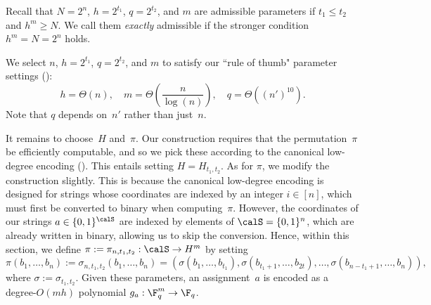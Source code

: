 \documentclass[11pt]{article}
\begin{document}
\begin{definition}\label{def:admissible}
Recall that
$N = 2^n$,
$h= 2^{t_1}$,
$q = 2^{t_2}$,
and $m$ are admissible parameters if $t_1 \leq t_2$ and $h^m \geq N$.
We call them \emph{exactly} admissible if the stronger condition $h^m = N = 2^n$ holds.
\end{definition}

We select $n$, $h = 2^{t_1}$, $q = 2^{t_2}$, and $m$ to satisfy our ``rule of thumb" parameter settings ():
\begin{equation*}
	h = \Theta(n), \quad m = \Theta\left(\frac{n}{\log(n)}\right), \quad q = \Theta((n')^{10}).
\end{equation*}
Note that $q$ depends on~$n'$ rather than just~$n$.

It remains to choose~$H$ and~$\pi$.
Our construction requires that the permutation~$\pi$ be efficiently computable,
and so we pick these according to the canonical low-degree encoding ().
This entails setting $H= H_{t_1, t_2}$.
As for $\pi$, we modify the construction slightly.
This is because the canonical low-degree encoding is designed for strings whose coordinates are indexed by an integer $i \in[n]$,
which must first be converted to binary when computing~$\pi$.
However, the coordinates of our strings $a \in \{0, 1\}^{\calS}$ are indexed by elements of $\calS = \{0, 1\}^n$,
which are already written in binary, allowing us to skip the conversion.
Hence, within this section, we define $\pi:=\pi_{n, t_1, t_2} :\calS \rightarrow H^m$ by setting
\begin{equation*}
\pi(b_1, \ldots, b_n) := \sigma_{n, t_1, t_2}(b_1, \ldots, b_n)= (\sigma(b_1, \ldots, b_{t_1}), \sigma(b_{t_1+1}, \ldots, b_{2t}), \ldots, \sigma(b_{n-t_1+1}, \ldots, b_n)),
\end{equation*}
where $\sigma:=\sigma_{t_1, t_2}$.
Given these parameters,
an assignment~$a$ is encoded as a degree-$O(mh)$ polynomial $g_a:\F_q^m \rightarrow \F_q$.
\end{document}
